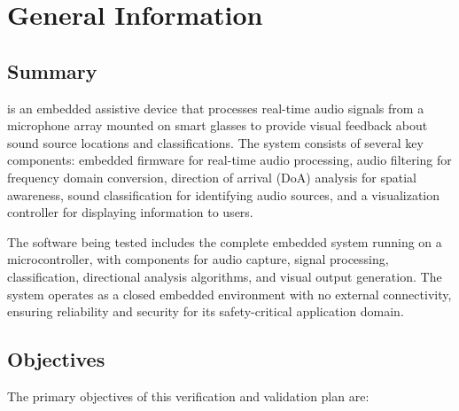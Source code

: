 \documentclass[12pt, titlepage]{article}
\begin{document}
\section{General Information}

\subsection{Summary}

\progname{} is an embedded assistive device that processes real-time audio
signals from a microphone array mounted on smart glasses to provide visual
feedback about sound source locations and classifications. The system consists
of several key components: embedded firmware for real-time audio processing,
audio filtering for frequency domain conversion, direction of arrival (DoA)
analysis for spatial awareness, sound classification for identifying audio
sources, and a visualization controller for displaying information to users.

The software being tested includes the complete embedded system running on a
microcontroller, with components for audio capture, signal processing,
classification, directional analysis algorithms, and visual output generation.
The system operates as a closed embedded environment with no external
connectivity, ensuring reliability and security for its safety-critical
application domain.

\subsection{Objectives}

The primary objectives of this verification and validation plan are:
\end{document}
